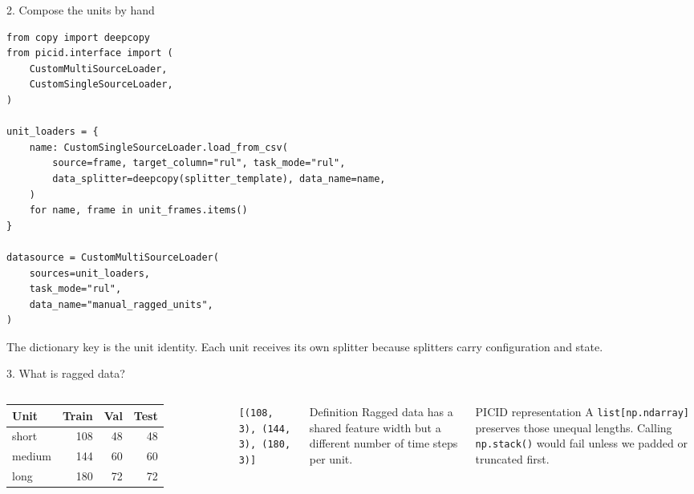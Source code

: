 \documentclass[aspectratio=169,10pt]{beamer}
\begin{document}
\begin{frame}[fragile]{2. Compose the units by hand}
\begin{lstlisting}[style=python]
from copy import deepcopy
from picid.interface import (
    CustomMultiSourceLoader,
    CustomSingleSourceLoader,
)

unit_loaders = {
    name: CustomSingleSourceLoader.load_from_csv(
        source=frame, target_column="rul", task_mode="rul",
        data_splitter=deepcopy(splitter_template), data_name=name,
    )
    for name, frame in unit_frames.items()
}

datasource = CustomMultiSourceLoader(
    sources=unit_loaders,
    task_mode="rul",
    data_name="manual_ragged_units",
)
\end{lstlisting}

  \small The dictionary key is the unit identity. Each unit receives its own
  splitter because splitters carry configuration and state.
\end{frame}

\begin{frame}{3. What is ragged data?}
  \begin{columns}[T,onlytextwidth]
      \centering
      \renewcommand{\arraystretch}{1.25}
      \begin{tabular}{lrrr}
        \toprule
        \textbf{Unit} & \textbf{Train} & \textbf{Val} & \textbf{Test} \\
        \midrule
        short  & 108 & 48 & 48 \\
        medium & 144 & 60 & 60 \\
        long   & 180 & 72 & 72 \\
        \bottomrule
      \end{tabular}

      \vspace{0.8em}
      \texttt{[(108, 3), (144, 3), (180, 3)]}
      \begin{block}{Definition}
        Ragged data has a shared feature width but a different number of time
        steps per unit.
      \end{block}
      \begin{block}{PICID representation}
        A \texttt{list[np.ndarray]} preserves those unequal lengths. Calling
        \texttt{np.stack()} would fail unless we padded or truncated first.
      \end{block}
  \end{columns}
\end{frame}
\end{document}
